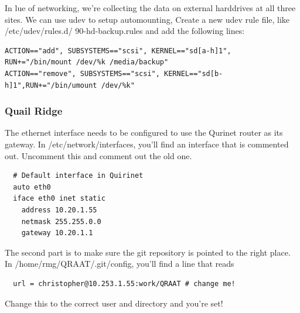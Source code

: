 \documentclass[letter]{article}
\begin{document}
In lue of networking, we're collecting the data on external harddrives at all three sites. We 
can use udev to setup automounting, Create a new udev rule file, like /etc/udev/rules.d/
90-hd-backup.rules and add the following lines:
\begin{verbatim}
ACTION=="add", SUBSYSTEMS=="scsi", KERNEL=="sd[a-h]1", RUN+="/bin/mount /dev/%k /media/backup"
ACTION=="remove", SUBSYSTEMS=="scsi", KERNEL=="sd[b-h]1",RUN+="/bin/umount /dev/%k"
\end{verbatim}


\subsubsection{Quail Ridge}
The ethernet interface needs to be configured to use the Qurinet router as its gateway. 
In /etc/network/interfaces, you'll find an interface that is commented out. 
Uncomment this and comment out the old one. 
\begin{verbatim}
  # Default interface in Quirinet
  auto eth0 
  iface eth0 inet static
    address 10.20.1.55
    netmask 255.255.0.0
    gateway 10.20.1.1
\end{verbatim}

The second part is to make sure the git repository is pointed to the right place. In 
/home/rmg/QRAAT/.git/config, you'll find a line that reads
\begin{verbatim}
  url = christopher@10.253.1.55:work/QRAAT # change me!
\end{verbatim}
Change this to the correct user and directory and you're set!
\end{document}
